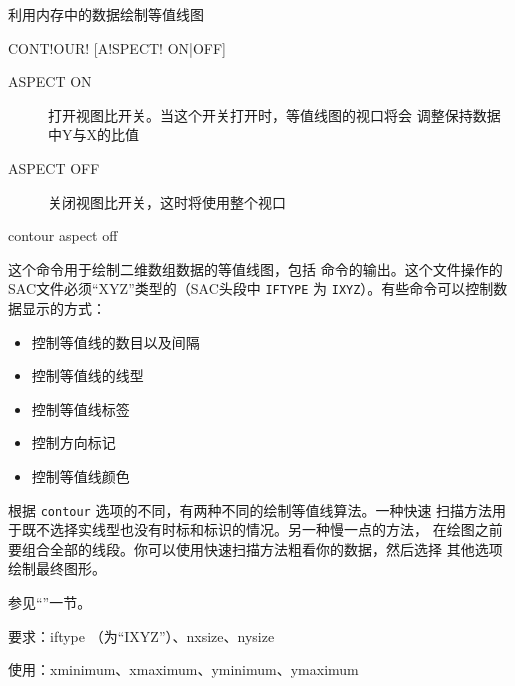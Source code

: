 \label{cmd:contour}

利用内存中的数据绘制等值线图

\begin{SACSTX}
CONT!OUR! [A!SPECT! ON|OFF]
\end{SACSTX}

\begin{description}
\item [ASPECT ON] 打开视图比开关。当这个开关打开时，等值线图的视口将会
    调整保持数据中Y与X的比值
\item [ASPECT OFF] 关闭视图比开关，这时将使用整个视口
\end{description}

\begin{SACDFT}
contour aspect off
\end{SACDFT}

这个命令用于绘制二维数组数据的等值线图，包括 
命令的输出。这个文件操作的SAC文件必须``XYZ''类型的（SAC头段中 \texttt{IFTYPE}
为 \texttt{IXYZ}）。有些命令可以控制数据显示的方式：
\begin{itemize}
\item {} 控制等值线的数目以及间隔
\item {} 控制等值线的线型
\item {} 控制等值线标签
\item {} 控制方向标记
\item {} 控制等值线颜色
\end{itemize}

根据 \texttt{contour} 选项的不同，有两种不同的绘制等值线算法。一种快速
扫描方法用于既不选择实线型也没有时标和标识的情况。另一种慢一点的方法，
在绘图之前要组合全部的线段。你可以使用快速扫描方法粗看你的数据，然后选择
其他选项绘制最终图形。

参见``''一节。

要求：iftype （为``IXYZ''）、nxsize、nysize

使用：xminimum、xmaximum、yminimum、ymaximum
